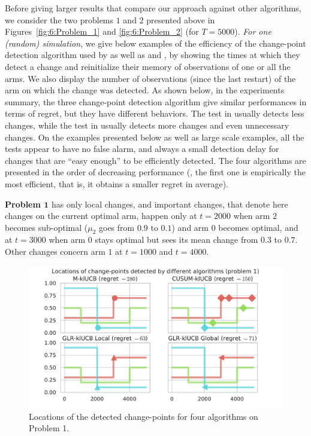Before giving larger results that compare our approach against other algorithms, we consider the two problems $1$ and $2$ presented above in Figures~\ref{fig:6:Problem_1} and \ref{fig:6:Problem_2} (for $T=5000$).
\emph{For one (random) simulation}, we give below examples of the efficiency of the change-point detection algorithm used by \GLRklUCB{} as well as \CUSUMklUCB{} and \MklUCB,
by showing the times at which they detect a change and reinitialize their memory of observations of one or all the arms.
We also display the number of observations (since the last restart) of the arm on which the change was detected.
As shown below, in the experiments summary, the three change-point detection algorithm give similar performances in terms of regret, but they have different behaviors.
The test in \MUCB{} usually detects less changes, while the test in \CUSUMUCB{} usually detects more changes and even unnecessary changes.
%
On the examples presented below as well as large scale examples, all the tests appear to have no false alarm, and always a small detection delay for changes that are ``easy enough'' to be efficiently detected.
The four algorithms are presented in the order of decreasing performance (\ie, the first one is empirically the most efficient, that is, it obtains a smaller regret in average).



\textbf{Problem $\bm{1}$} has only local changes, and important changes, that denote here changes on the current optimal arm, happen only at $t=2000$ when arm $2$ becomes sub-optimal ($\mu_2$ goes from $0.9$ to $0.1$) and arm $0$ becomes optimal, and at $t=3000$ when arm $0$ stays optimal but sees its mean change from $0.3$ to $0.7$.
Other changes concern arm $1$ at $t=1000$ and $t=4000$.


\begin{figure}[h!]  %
    \centering
    \includegraphics[width=1.00\linewidth]{2-Chapters/6-Chapter/Images/Visualizing_locations_of_change_points_for_different_algorithms__4algs_Pb1.pdf}
    \caption{Locations of the detected change-points for four algorithms on Problem 1.}
    \label{fig:6:Visualizing_locations_of_change_points_for_different_algorithms__4algs_Pb1}
\end{figure}

